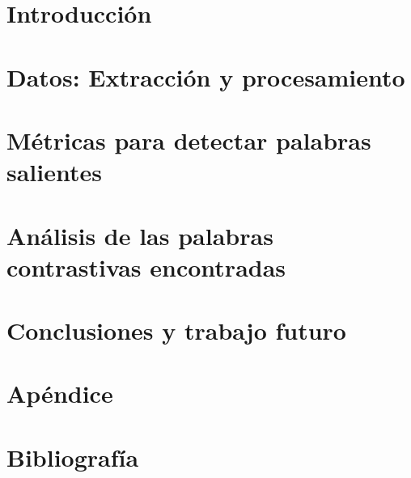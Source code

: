 \documentclass[11pt,a4paper]{tesis}
\begin{document}
\def\titulo{Licenciatura\xspace}

\def\autor{Damián Eliel Aleman}
\def\tituloTesis{Titulo de Tesis}
\def\runtitulo{\tituloTesis}
\def\director{Juan Manuel Pérez y Santiago Kalinowski}
\def\codirector{Agustín Gravano}
\def\lugar{Buenos Aires, 2017}
%



\frontmatter
\pagestyle{empty}




\tableofcontents

\mainmatter
\pagestyle{headings}


\chapter{Introducción}
\label{ch:introduccion}


\chapter{Datos: Extracción y procesamiento}
\label{ch:datos}


\chapter{Métricas para detectar palabras salientes}
\label{ch:metricas}


\chapter{Análisis de las palabras contrastivas encontradas}
\label{ch:validacion}


\chapter{Conclusiones y trabajo futuro}
\label{ch:conclusiones}


\chapter{Apéndice}
\label{ch:apendice}



\chapter{Bibliografía}
\backmatter



\end{document}
